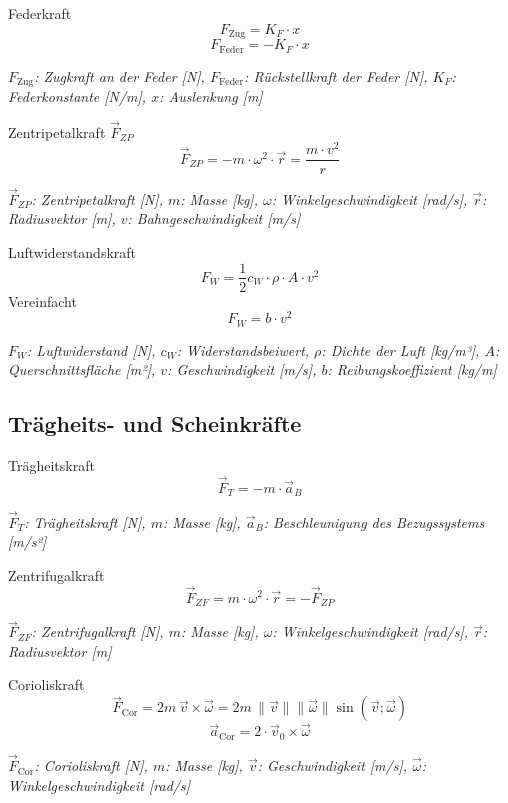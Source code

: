 \documentclass[a5paper,10pt]{article}
\newenvironment{displayformula}
{
	\begin{framed}
		\color{formulaColor}
	}
	{\end{framed}}
\newcommand{\formulalegend}[1]{%
	\par\vspace{0.5ex}%
	{{\color{legendColor}\RaggedRight\small\textit{#1}}}%
	\par\vspace{1.5ex}%
}
\begin{document}
\begin{displayformula}
	Federkraft
	\[
	F_{\text{Zug}} = K_F \cdot x
	\]
	\[
	F_{\text{Feder}} = -K_F \cdot x
	\]
\end{displayformula}
\formulalegend{
	\( F_{\text{Zug}} \): Zugkraft an der Feder [N], \( F_{\text{Feder}} \): Rückstellkraft der Feder [N], \( K_F \): Federkonstante [N/m], \( x \): Auslenkung [m]
}

\begin{displayformula}
	Zentripetalkraft \( \vec{F}_{ZP} \)
	\[
	\vec{F}_{ZP} = -m \cdot \omega^2 \cdot \vec{r} = \frac{m \cdot v^2}{r}
	\]
\end{displayformula}
\formulalegend{
	\( \vec{F}_{ZP} \): Zentripetalkraft [N], \( m \): Masse [kg], \( \omega \): Winkelgeschwindigkeit [rad/s], \( \vec{r} \): Radiusvektor [m], \( v \): Bahngeschwindigkeit [m/s]
}

\begin{displayformula}
	Luftwiderstandskraft
	\[
	F_W = \frac{1}{2} c_W \cdot \rho \cdot A \cdot v^2
	\]
	Vereinfacht
	\[
	F_W = b \cdot v^2
	\]
\end{displayformula}
\formulalegend{
	\( F_W \): Luftwiderstand [N], \( c_W \): Widerstandsbeiwert, \( \rho \): Dichte der Luft [kg/m³], \( A \): Querschnittsfläche [m²], \( v \): Geschwindigkeit [m/s], \( b \): Reibungskoeffizient [kg/m]
}
\newpage

\subsection{Trägheits- und Scheinkräfte}

\begin{displayformula}
	Trägheitskraft
	\[
	\vec{F}_T = -m \cdot \vec{a}_B
	\]
\end{displayformula}
\formulalegend{
	\( \vec{F}_T \): Trägheitskraft [N], \( m \): Masse [kg], \( \vec{a}_B \): Beschleunigung des Bezugssystems [m/s²]
}

\begin{displayformula}
	Zentrifugalkraft
	\[
	\vec{F}_{ZF} = m \cdot \omega^2 \cdot \vec{r} = - \vec{F}_{ZP}
	\]
\end{displayformula}
\formulalegend{
	\( \vec{F}_{ZF} \): Zentrifugalkraft [N], \( m \): Masse [kg], \( \omega \): Winkelgeschwindigkeit [rad/s], \( \vec{r} \): Radiusvektor [m]
}

\begin{displayformula}
	Corioliskraft
	\[
	\vec{F}_{\mathrm{Cor}} = 2m\, \vec{v} \times \vec{\omega} = 2m\, \lVert \vec{v} \rVert \lVert \vec{\omega} \rVert \sin(\vec{v}; \vec{\omega})
	\]
	\[
	\vec{a}_{\mathrm{Cor}} = 2 \cdot \vec{v}_0 \times \vec{\omega}
	\]
\end{displayformula}
\formulalegend{
	\( \vec{F}_{\mathrm{Cor}} \): Corioliskraft [N], \( m \): Masse [kg], \( \vec{v} \): Geschwindigkeit [m/s], \( \vec{\omega} \): \\ Winkelgeschwindigkeit [rad/s]
}
\newpage
\end{document}
